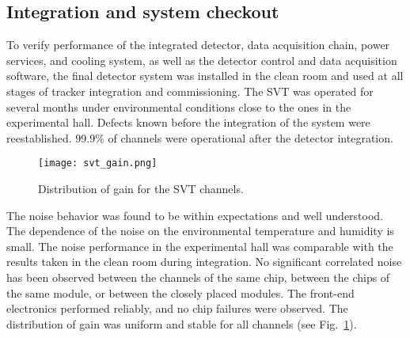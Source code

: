 %
%

%

\subsection{Integration and system checkout}

To verify performance of the integrated detector, data acquisition chain, power services, and cooling system, as well as the detector control and data acquisition software, the final detector system was installed in the clean room and used at all stages of tracker integration and commissioning. The SVT was operated for several months under environmental conditions close to the ones in the experimental hall. Defects known before the integration of the system were reestablished. 99.9$\%$ of channels were operational after the detector integration. 

\begin{figure}[hbt] 
\centering 
\texttt{[image: svt\_gain.png]}
\caption{Distribution of gain for the SVT channels.}
\label{fig:svt_gain}
\end{figure}

The noise behavior was found to be within expectations and well understood. The dependence of the noise on the environmental temperature and humidity is small. The noise performance in the experimental hall was comparable with the results taken in the clean room during integration. No significant correlated noise has been observed between the channels of the same chip, between the chips of the same module, or between the closely placed modules. The front-end electronics performed reliably, and no chip failures were observed. The distribution of gain was uniform and stable for all channels (see Fig.~\ref{fig:svt_gain}). 
 

